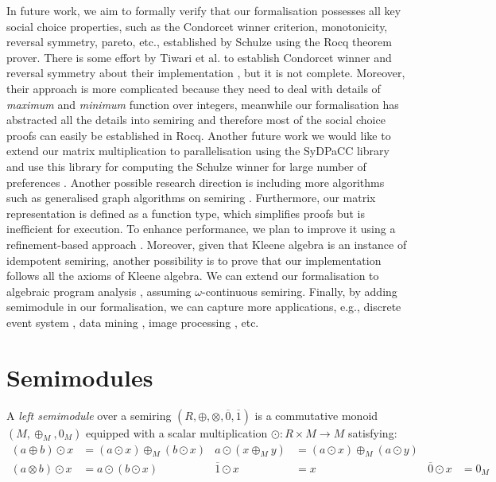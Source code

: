 \documentclass[a4paper,UKenglish,cleveref, autoref, thm-restate, anonymous]{lipics-v2021}
\begin{document}
\vspace{2mm}
In future work, we aim to formally verify that our formalisation possesses all key social choice properties, such as the Condorcet winner criterion, monotonicity, 
reversal symmetry, pareto, etc.,  
established by Schulze \cite{schulze2011new} using the Rocq theorem prover.
There is some effort by Tiwari et al. \cite{Tiwari2021b} to 
establish Condorcet winner and reversal symmetry about their implementation \cite{pattinson2017schulze},
but it is not complete. Moreover, their approach is more complicated 
because they need to deal with details of \emph{maximum} and 
\emph{minimum} function 
over integers, meanwhile our formalisation has abstracted all the details into 
semiring and therefore most of the social choice proofs 
can easily be established in Rocq. Another future 
work we would like to extend our matrix multiplication 
to parallelisation using the SyDPaCC \cite{10.1145/3605156.3606450} library 
and use this library for computing the Schulze winner for 
large number of preferences \cite{10.5555/3304415.3304442}. 
Another possible research direction is including more algorithms such 
as generalised graph algorithms on semiring \cite{10.5555/639508.639512,GUTTMANN201837}. 
Furthermore, our matrix representation is defined as a function type, which simplifies proofs but is 
inefficient for execution. To enhance performance, we plan to improve it using a refinement-based approach \cite{10.1007/978-3-642-32347-8_7}. 
Moreover, given that Kleene algebra is an instance of 
idempotent semiring, another possibility is to prove that our implementation 
follows all the axioms of Kleene algebra. 
We can extend our formalisation to algebraic program analysis \cite{esparza2010newtonian,kincaid2021algebraic}, 
assuming $\omega$-continuous semiring. Finally, by adding 
semimodule \cite{Głazek2002,Golan1999,10.5555/1386688} in our formalisation, we can capture more 
applications, e.g., discrete event system \cite{baccelli1992synchronization}, 
data mining \cite{10.1007/978-3-540-70901-5_12}, 
image processing \cite{10.1016/j.ins.2006.09.002}, etc. 







\section{Semimodules}
\label{sec:semimodules}

A \emph{left semimodule} over a semiring $(R, \oplus, \otimes, \overline{0}, \overline{1})$
is a commutative monoid $(M, \oplus_M, 0_M)$ equipped with a scalar multiplication
$\odot : R \times M \to M$ satisfying:
\begin{align*}
(a \oplus b) \odot x &= (a \odot x) \oplus_M (b \odot x) &
a \odot (x \oplus_M y) &= (a \odot x) \oplus_M (a \odot y) \\
(a \otimes b) \odot x &= a \odot (b \odot x) &
\overline{1} \odot x &= x &
\overline{0} \odot x &= 0_M
\end{align*}
\end{document}
